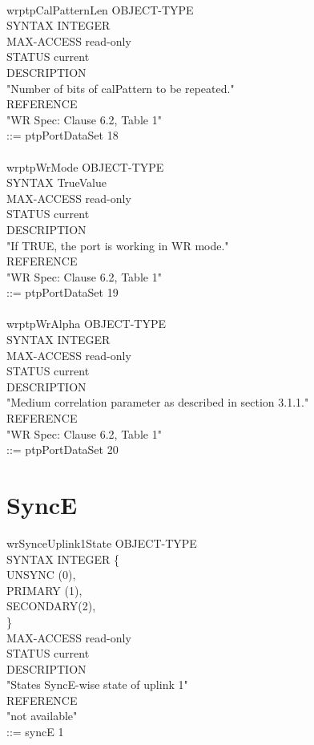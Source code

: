 \\
wrptpCalPatternLen OBJECT-TYPE \\
SYNTAX INTEGER \\
MAX-ACCESS read-only \\
STATUS current \\
DESCRIPTION \\
"Number of bits of calPattern to be repeated." \\
REFERENCE \\
"WR Spec: Clause 6.2, Table 1" \\
::= { ptpPortDataSet 18 } \\
\\
wrptpWrMode OBJECT-TYPE \\
SYNTAX TrueValue \\
MAX-ACCESS read-only \\
STATUS current \\
DESCRIPTION \\
"If TRUE, the port is working in WR mode." \\
REFERENCE \\
"WR Spec: Clause 6.2, Table 1" \\
::= { ptpPortDataSet 19 } \\
\\
wrptpWrAlpha OBJECT-TYPE \\
SYNTAX INTEGER \\
MAX-ACCESS read-only \\
STATUS current \\
DESCRIPTION \\
"Medium correlation parameter as described in section 3.1.1." \\
REFERENCE \\
"WR Spec: Clause 6.2, Table 1" \\
::= { ptpPortDataSet 20 } \\

\section{SyncE}

wrSynceUplink1State OBJECT-TYPE \\
SYNTAX INTEGER \{ \\
\tab UNSYNC (0), \\
\tab PRIMARY (1), \\
\tab SECONDARY(2), \\
\} \\
MAX-ACCESS read-only \\
STATUS current \\
DESCRIPTION \\
"States SyncE-wise state of uplink 1"  \\
REFERENCE \\
"not available" \\
::= { syncE 1 } \\
\\

